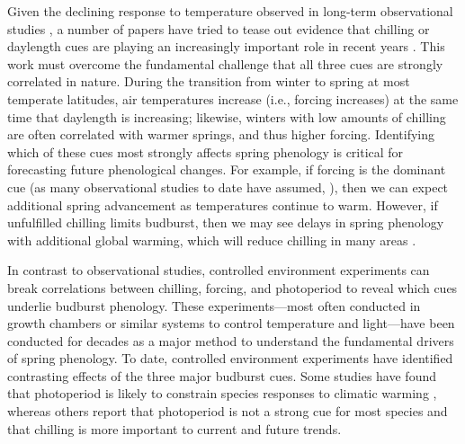 \documentclass{article}
\begin{document}
\par Given the declining response to temperature observed in long-term observational studies \citep{fu2015}, a number of papers have tried to tease out evidence that chilling or daylength cues are playing an increasingly important role in recent years \citep{Basler:2014aa,zohner2016, Laube:2014a}. This work must overcome the fundamental challenge that all three cues are strongly correlated in nature. During the transition from winter to spring at most temperate latitudes, air temperatures increase (i.e., forcing increases) at the same time that daylength is increasing; likewise, winters with low amounts of chilling are often correlated with warmer springs, and thus higher forcing.  Identifying which of these cues most strongly affects spring phenology is critical for forecasting future phenological changes. For example, if forcing is the dominant cue (as many observational studies to date have assumed, \citep{bradley1999,menzel2006,harrington2015}), then we can expect additional spring advancement as temperatures continue to warm. However, if unfulfilled chilling limits budburst, then we may see delays in spring phenology with additional global warming, which will reduce chilling in many areas \citep{fraga2019}. 


\par In contrast to observational studies, controlled environment experiments can break correlations between chilling, forcing, and photoperiod to reveal which cues underlie budburst phenology. These experiments---most often conducted in growth chambers or similar systems to control temperature and light---have been conducted for decades as a major method to understand the fundamental drivers of spring phenology. To date, controlled environment experiments have identified contrasting effects of the three major budburst cues. Some studies have found that photoperiod is likely to constrain species responses to climatic warming \citep{Basler:2012, Caffarra:2011b,Caffarra:2011a}, whereas others report that photoperiod is not a strong cue for most species \citep{zohner2016,Laube:2014a} and that chilling is more important to current and future trends. 
\end{document}
